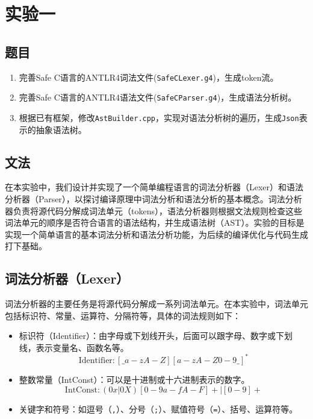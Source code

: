 \documentclass[../main.tex]{subfiles}
\begin{document}
\section{实验一}

\subsection{题目}

\kaishu

\begin{enumerate}
	\item 完善Safe C语言的ANTLR4词法文件(\texttt{SafeCLexer.g4})，生成token流。
	\item 完善Safe C语言的ANTLR4语法文件(\texttt{SafeCParser.g4})，生成语法分析树。
	\item 根据已有框架，修改\texttt{AstBuilder.cpp}，实现对语法分析树的遍历，生成\texttt{Json}表示的抽象语法树。
\end{enumerate}

\subsection{文法}

在本实验中，我们设计并实现了一个简单编程语言的词法分析器（Lexer）和语法分析器（Parser），以探讨编译原理中词法分析和语法分析的基本概念。词法分析器负责将源代码分解成词法单元（tokens），语法分析器则根据文法规则检查这些词法单元的顺序是否符合语言的语法结构，并生成语法树（AST）。实验的目标是实现一个简单语言的基本词法分析和语法分析功能，为后续的编译优化与代码生成打下基础。

\subsection{词法分析器（Lexer）}

词法分析器的主要任务是将源代码分解成一系列词法单元。在本实验中，词法单元包括标识符、常量、运算符、分隔符等，具体的词法规则如下：

\begin{itemize}
	\item 标识符（Identifier）：由字母或下划线开头，后面可以跟字母、数字或下划线，表示变量名、函数名等。
	      \[
		      \text{Identifier} \colon [\_a-zA-Z][a-zA-Z0-9\_]^*
	      \]

	\item 整数常量（IntConst）：可以是十进制或十六进制表示的数字。
	      \[
		      \text{IntConst} \colon (0x | 0X)[0-9a-fA-F]+ \mid [0-9]+
	      \]

	\item 关键字和符号：如逗号（\texttt{,}）、分号（\texttt{;}）、赋值符号（\texttt{=}）、括号、运算符等。
\end{itemize}
\end{document}
